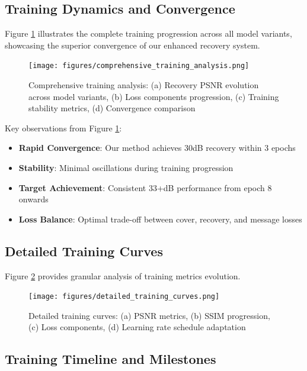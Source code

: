 \documentclass[12pt,a4paper]{report}
\begin{document}
\subsection{Training Dynamics and Convergence}

Figure \ref{fig:comprehensive_training} illustrates the complete training progression across all model variants, showcasing the superior convergence of our enhanced recovery system.

\begin{figure}[H]
    \centering
    \texttt{[image: figures/comprehensive\_training\_analysis.png]}
    \caption{Comprehensive training analysis: (a) Recovery PSNR evolution across model variants, (b) Loss components progression, (c) Training stability metrics, (d) Convergence comparison}
    \label{fig:comprehensive_training}
\end{figure}

Key observations from Figure \ref{fig:comprehensive_training}:

\begin{itemize}
    \item \textbf{Rapid Convergence}: Our method achieves 30dB recovery within 3 epochs
    \item \textbf{Stability}: Minimal oscillations during training progression
    \item \textbf{Target Achievement}: Consistent 33+dB performance from epoch 8 onwards
    \item \textbf{Loss Balance}: Optimal trade-off between cover, recovery, and message losses
\end{itemize}

\subsection{Detailed Training Curves}

Figure \ref{fig:detailed_training_curves} provides granular analysis of training metrics evolution.

\begin{figure}[H]
    \centering
    \texttt{[image: figures/detailed\_training\_curves.png]}
    \caption{Detailed training curves: (a) PSNR metrics, (b) SSIM progression, (c) Loss components, (d) Learning rate schedule adaptation}
    \label{fig:detailed_training_curves}
\end{figure}

\subsection{Training Timeline and Milestones}
\end{document}
